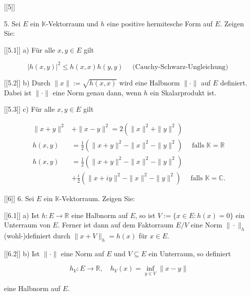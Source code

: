 [[5]]

5. Sei $E$ ein $\mathbb{K}$-Vektorraum und $h$ eine positive hermitesche Form auf $E$. Zeigen Sie:

[[5.1]]
a) Für alle $x, y \in E$ gilt

$$
|h(x, y)|^2 \leq h(x, x) h(y, y) \quad \text { (Cauchy-Schwarz-Ungleichung) }
$$

[[5.2]]
b) Durch $\|x\|:=\sqrt{h(x, x)}$ wird eine Halbnorm $\|\cdot\|$ auf $E$ definiert. Dabei ist $\|\cdot\|$ eine Norm genau dann, wenn $h$ ein Skalarprodukt ist.

[[5.3]]
c) Für alle $x, y \in E$ gilt

$$
\begin{aligned}
\|x+y\|^2 & +\|x-y\|^2=2\left(\|x\|^2+\|y\|^2\right) \\
h(x, y) & =\frac{1}{2}\left(\|x+y\|^2-\|x\|^2-\|y\|^2\right) \quad \text { falls } \mathbb{K}=\mathbb{R} \\
h(x, y) & =\frac{1}{2}\left(\|x+y\|^2-\|x\|^2-\|y\|^2\right) \\
& +\frac{i}{2}\left(\|x+i y\|^2-\|x\|^2-\|y\|^2\right) \quad \text { falls } \mathbb{K}=\mathbb{C} .
\end{aligned}
$$


[[6]]
6. Sei $E$ ein $\mathbb{K}$-Vektorraum. Zeigen Sie:

[[6.1]]
a) Ist $h: E \rightarrow \mathbb{R}$ eine Halbnorm auf $E$, so ist $V:=\{x \in E: h(x)=0\}$ ein Unterraum von $E$. Ferner ist dann auf dem Faktorraum $E / V$ eine Norm $\|\cdot\|_h$ (wohl-)definiert durch $\|x+V\|_h=h(x)$ für $x \in E$.

[[6.2]]
b) Ist $\|\cdot\|$ eine Norm auf $E$ und $V \subseteq E$ ein Unterraum, so definiert

$$
h_V: E \rightarrow \mathbb{R}, \quad h_V(x)=\inf _{y \in V}\|x-y\|
$$

eine Halbnorm auf $E$.